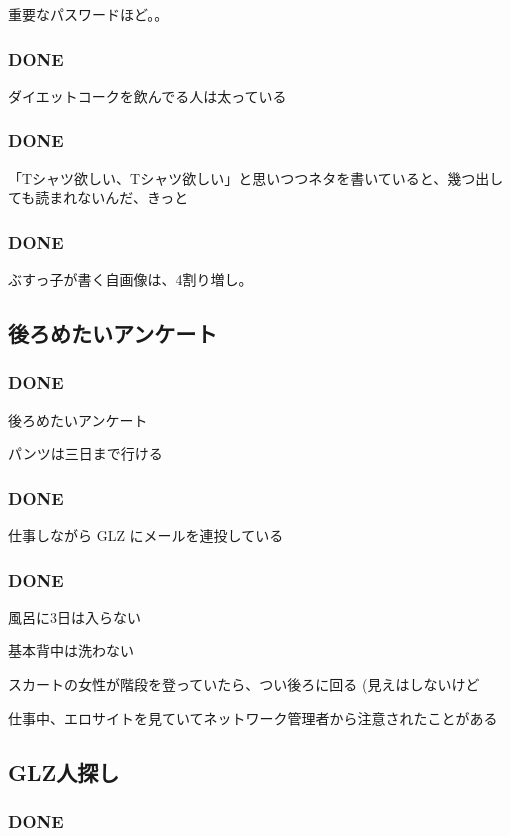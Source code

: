 \documentclass[11pt]{article}
\begin{document}
重要なパスワードほど。。
\subsubsection{\textbf{DONE}}
\label{sec-109_1_7}

ダイエットコークを飲んでる人は太っている
\subsubsection{\textbf{DONE}}
\label{sec-109_1_8}

「Tシャツ欲しい、Tシャツ欲しい」と思いつつネタを書いていると、幾つ出しても読まれないんだ、きっと
\subsubsection{\textbf{DONE}}
\label{sec-109_1_9}

ぶすっ子が書く自画像は、4割り増し。
\subsection{後ろめたいアンケート}
\label{sec-109_2}
\subsubsection{\textbf{DONE}}
\label{sec-109_2_1}

後ろめたいアンケート

パンツは三日まで行ける
\subsubsection{\textbf{DONE}}
\label{sec-109_2_2}

仕事しながら GLZ にメールを連投している
\subsubsection{\textbf{DONE}}
\label{sec-109_2_3}

風呂に3日は入らない

基本背中は洗わない

スカートの女性が階段を登っていたら、つい後ろに回る (見えはしないけど

仕事中、エロサイトを見ていてネットワーク管理者から注意されたことがある
\subsection{GLZ人探し}
\label{sec-109_3}
\subsubsection{\textbf{DONE}}
\label{sec-109_3_1}
\end{document}
